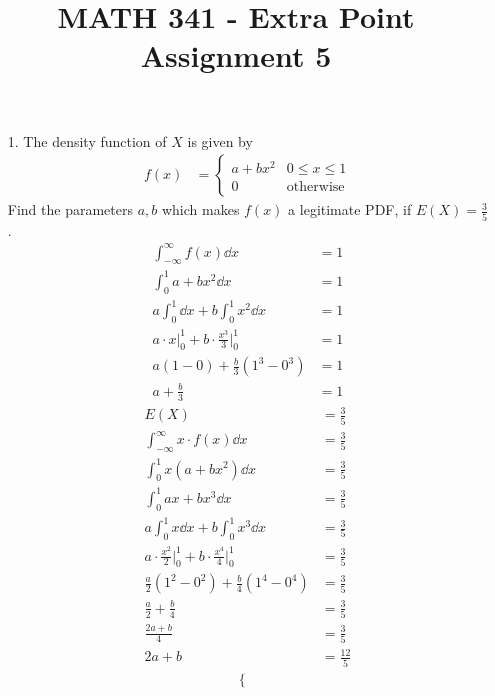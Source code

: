 \documentclass[letterpaper,12pt]{article}
\title{MATH 341 - Extra Point Assignment 5}
\begin{document}
\maketitle

\begin{enumerate}
  \item[1.]
    The density function of $X$ is given by
    \begin{align*}
      f(x) &= \begin{cases}
        a + bx^2 & 0 \le x \le 1 \\
        0        & \text{otherwise}
      \end{cases}
    \end{align*}
    Find the parameters $a, b$ which makes $f(x)$ a legitimate PDF, if $E(X) = \frac{3}{5}$.
    \begin{align*}
      \int_{-\infty}^{\infty} f(x) \dd{x} &= 1 \\
      \int_{0}^{1} a + bx^2 \dd{x} &= 1 \\
      a\int_{0}^{1} \dd{x} + b\int_{0}^{1} x^2 \dd{x} &= 1 \\
      a \cdot x \big\rvert_{0}^{1} + b \cdot \frac{x^3}{3} \bigg\rvert_{0}^{1} &= 1 \\
      a(1 - 0) + \frac{b}{3}(1^3 - 0^3) &= 1 \\
      a + \frac{b}{3} &= 1
    \end{align*}
    \begin{align*}
        E(X) &= \frac{3}{5} \\
        \int_{-\infty}^{\infty} x \cdot f(x) \dd{x} &= \frac{3}{5} \\
        \int_{0}^{1} x(a + bx^2) \dd{x} &= \frac{3}{5} \\
        \int_{0}^{1} ax + bx^3 \dd{x} &= \frac{3}{5} \\
        a\int_{0}^{1} x \dd{x} + b\int_{0}^{1} x^3 \dd{x} &= \frac{3}{5} \\
        a \cdot \frac{x^2}{2} \bigg\rvert_{0}^{1} + b \cdot \frac{x^4}{4} \bigg\rvert_{0}^{1} &= \frac{3}{5} \\
        \frac{a}{2}(1^2 - 0^2) + \frac{b}{4}(1^4 - 0^4) &= \frac{3}{5} \\
        \frac{a}{2} + \frac{b}{4} &= \frac{3}{5} \\
        \frac{2a + b}{4} &= \frac{3}{5} \\
        2a + b &= \frac{12}{5}
    \end{align*}
    \begin{align*}
      \begin{cases}

\end{cases}
\end{align*}
\end{enumerate}
\end{document}
